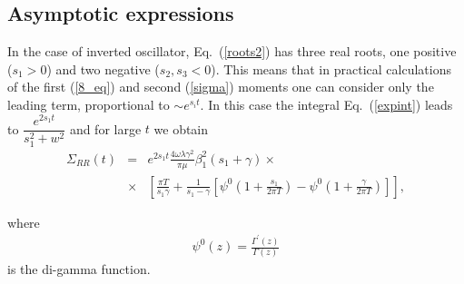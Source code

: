 \documentclass[preprint,review,12pt]{elsarticle}
\begin{document}
\subsection{Asymptotic expressions }

  In the case of inverted oscillator, Eq.~(\ref{roots2}) has three real roots, one positive ($s_1>0$) and two negative ($s_2,s_3<0$).
  This means that in practical calculations of the first (\ref{8_eq}) and second (\ref{sigma}) moments one can
  consider only the leading term,
  proportional to $\sim e^{s_i t}$.
  In this case the integral Eq.~(\ref{expint}) leads to $\dfrac{e^{2 s_1 t}}{s_1^2+w^2}$ and for large $t$ we obtain
  \begin{eqnarray}
  \Sigma_{RR}(t)&=& e^{2 s_1 t}\frac{4 \omega \lambda\gamma^2}{\pi \mu}\beta_1^2(s_1+\gamma) \times \nonumber\\
  &\times& \left[\frac{\pi T}{s_1\gamma}+\frac{1}{s_1-\gamma}
  \left[\psi^{0}\left(1+\frac{s_1}{2\pi T}\right)-\psi^{0}\left(1+\frac{\gamma}{2\pi T}\right)\right]\right],
  \label{sigmaAs}
  \end{eqnarray}

  where
  \begin{eqnarray}
  \psi^{0}(z)=\frac{\Gamma^{'}(z)}{\Gamma(z)}
  \end{eqnarray}
  is the di-gamma function.
\end{document}
